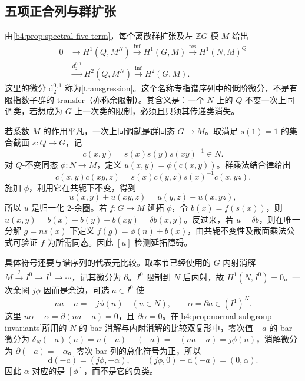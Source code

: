 \subsection{五项正合列与群扩张}
\label{b4:subsec:1504:03}

由\cref{b4:prop:spectral-five-term}，每个离散群扩张及左 \(\mathbb ZG\)-模 \(M\) 给出
\begin{equation}\label{b4:eq:lhs-five-term}
	\begin{aligned}
		0&\longrightarrow H^1(Q,M^N)\xrightarrow{\mathrm{inf}}H^1(G,M) \xrightarrow{\mathrm{res}}H^1(N,M)^Q\\
		&\xrightarrow{\mathrm d_2^{0,1}}H^2(Q,M^N) \xrightarrow{\mathrm{inf}}H^2(G,M).
	\end{aligned}
\end{equation}
这里的微分 \(\mathrm d_2^{0,1}\) 称为[transgression]。这个名称专指谱序列中的低阶微分，不是有限指数子群的 transfer（亦称余限制）。其含义是：一个 \(N\) 上的 \(Q\)-不变一次上同调类，若想成为 \(G\) 上一次类的限制，必须且只须其传递类消失。

\ProseParagraphBreak
若系数 \(M\) 的作用平凡，一次上同调就是群同态 \(G\to M\)。取满足 \(s(1)=1\) 的集合截面 \(s:Q\to G\)，记
\[
	c(x,y)=s(x)s(y)s(xy)^{-1}\in N.
\]
对 \(Q\)-不变同态 \(\phi:N\to M\)，定义 \(u(x,y)=\phi(c(x,y))\)。群乘法结合律给出
\[
	c(x,y)c(xy,z)=s(x)c(y,z)s(x)^{-1}c(x,yz).
\]
施加 \(\phi\)，利用它在共轭下不变，得到
\[
	u(x,y)+u(xy,z)=u(y,z)+u(x,yz),
\]
所以 \(u\) 是归一化 \(2\)-余圈。若 \(f:G\to M\) 延拓 \(\phi\)，令 \(b(x)=f(s(x))\)，则 \(u(x,y)=b(x)+b(y)-b(xy)=\delta b(x,y)\)。反过来，若 \(u=\delta b\)，则在唯一分解 \(g=ns(x)\) 下定义 \(f(g)=\phi(n)+b(x)\)，由共轭不变性及截面乘法公式可验证 \(f\) 为所需同态。因此 \([u]\) 检测延拓障碍。

\ProseParagraphBreak
具体符号还要与谱序列的代表元比较。取本节已经使用的 \(G\) 内射消解 \(M\xrightarrow{j}I^0\to I^1\to\cdots\)，记其微分为 \(\partial\)。\(I^0\) 限制到 \(N\) 后内射，故 \(H^1(N,I^0)=0\)。一次余圈 \(j\phi\) 因而是余边，可选 \(a\in I^0\) 使
\[
	na-a=-j\phi(n)\quad(n\in N),\qquad \alpha=\partial a\in(I^1)^N.
\]
这里 \(n\alpha-\alpha=\partial(na-a)=0\)，且 \(\partial\alpha=0\)。在\cref{b4:prop:normal-subgroup-invariants}所用的 \(N\) 的 bar 消解与内射消解的比较双复形中，零次值 \(-a\) 的 bar 微分为 \(\delta_N(-a)(n)=n(-a)-(-a)=-(na-a)=j\phi(n)\)，消解微分为 \(\partial(-a)=-\alpha\)。零次 bar 列的总化符号为正，所以
\[
	\mathrm d(-a)=(j\phi,-\alpha),\qquad (j\phi,0)-\mathrm d(-a)=(0,\alpha).
\]
因此 \(\alpha\) 对应的是 \([\phi]\)，而不是它的负类。

